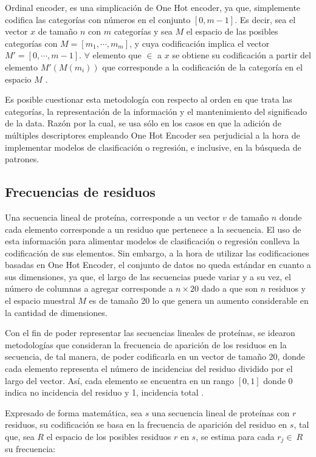Ordinal encoder, es una simplicación de One Hot encoder, ya que, simplemente codifica las categorías con números en el conjunto $[0, m-1]$. Es decir, sea el vector $x$ de tamaño $n$ con $m$ categorías y sea $M$ el espacio de las posibles categorías con $M = [m_{1}, \cdots, m_{m}]$, y cuya codificación implica el vector $M' = [0, \cdots, m-1]$. $\forall $ elemento que $\in$ a $x$ se obtiene su codificación a partir del elemento $M'(M(m_{i}))$ que corresponde a la codificación de la categoría en el espacio $M$ \cite{pedregosa2011scikit}.

Es posible cuestionar esta metodología con respecto al orden en que trata las categorías, la representación de la información y el mantenimiento del significado de la data. Razón por la cual, se usa sólo en los casos en que la adición de múltiples descriptores empleando One Hot Encoder sea perjudicial a la hora de implementar modelos de clasificación o regresión, e inclusive, en la búsqueda de patrones.

\subsection{Frecuencias de residuos}

Una secuencia lineal de proteína, corresponde a un vector $v$ de tamaño $n$ donde cada elemento corresponde a un residuo que pertenece a la secuencia. El uso de esta información para alimentar modelos de clasificación o regresión conlleva la codificación de sus elementos. Sin embargo, a la hora de utilizar las codificaciones basadas en One Hot Encoder, el conjunto de datos no queda estándar en cuanto a sus dimensiones, ya que, el largo de las secuencias puede variar y a su vez, el número de columnas a agregar corresponde a $n \times 20$ dado a que son $n$ residuos y el espacio muestral $M$ es de tamaño 20 lo que genera un aumento considerable en la cantidad de dimensiones.

Con el fin de poder representar las secuencias lineales de proteínas, se idearon metodologías que consideran la frecuencia de aparición de los residuos en la secuencia, de tal manera, de poder codificarla en un vector de tamaño 20, donde cada elemento representa el número de incidencias del residuo dividido por el largo del vector. Así, cada elemento se encuentra en un rango $[0,1]$ donde 0 indica no incidencia del residuo y 1, incidencia total \cite{ozbudak2014protein}.

Expresado de forma matemática, sea $s$ una secuencia lineal de proteínas con $r$ residuos, su codificación se basa en la frecuencia de aparición del residuo en $s$, tal que, sea $R$ el espacio de los posibles residuos $r$ en $s$, se estima para cada $r_{j} \in\ R$ su frecuencia:

